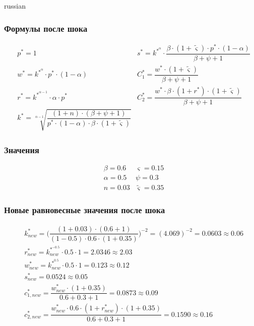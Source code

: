 \documentclass[fleqn]{article}
\begin{document}
\begin{otherlanguage*}{russian}
\subsubsection*{Формулы после шока}
\begin{align*}
&p^* = 1 
&s^* = k^{*^\alpha} \cdot \dfrac{\beta \cdot (1 + \tilde \varsigma )  \cdot p^* \cdot (1 - \alpha)}{\beta + \psi + 1 } \\
&w^* = k^{*^\alpha}  \cdot p^* \cdot (1 - \alpha) 
&C_{1}^* = \dfrac{w^* \cdot (1 + \tilde \varsigma ) }{\beta + \psi + 1} \\
&r^* = k^{*^{\alpha - 1}} \cdot \alpha \cdot p^* 
&C_{2}^* = \dfrac{w^* \cdot \beta \cdot (1 + r^*) \cdot (1 + \tilde \varsigma ) }{\beta + \psi + 1}  \\
&k^* = \sqrt[\alpha - 1]{
\dfrac{(1 + n) \cdot ( \beta + \psi + 1) }{p^* \cdot (1 - \alpha) \cdot \beta \cdot (1 + \tilde \varsigma )}
}
\end{align*}
\subsubsection*{Значения}
\begin{align*}
&\beta = 0.6 
&\varsigma = 0.15 \\ 
&\alpha = 0.5  
&\psi = 0.3 \\ 
&n = 0.03 
& \tilde{\varsigma}  = 0.35 
\end{align*}
\subsubsection*{Новые равновесные значения после шока} 
\begin{align*}
&k^*_{new}= \Big( \dfrac{(1 + 0.03) \cdot (0.6 + 1)}{(1 - 0.5 ) \cdot 0.6 \cdot (1 + 0.35)} \Big)^{-2} = (4.069)^{-2} = 0.0603 \approx 0.06 \\
&r^*_{new} = k^{*^{-0.5}}_{new} \cdot 0.5 \cdot 1 = 2.0346 \approx 2.03 \\
&w^*_{new} = k^{*^{0.5}}_{new} \cdot 0.5 \cdot 1 =  0.123 \approx 0.12 \\
&s^*_{new} = 0.0524 \approx 0.05 \\
&c_{1, new}^* =\dfrac{w^*_{new} \cdot (1 + 0.35) }{0.6 + 0.3 + 1}  =0.0873 \approx 0.09\\
&c_{2, new}^*= \dfrac{w^*_{new} \cdot 0.6 \cdot (1 + r^*_{new}) \cdot (1 + 0.35)}{0.6 + 0.3 + 1}  = 0.1590 \approx 0.16 
\end{align*}

\end{otherlanguage*}
\end{document}
